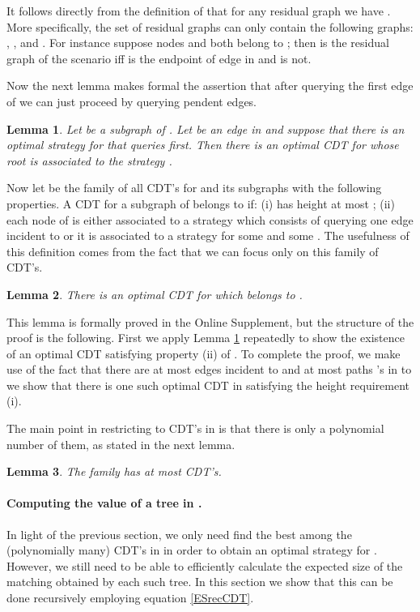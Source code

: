 \documentclass[12pt]{article}
\newtheorem{lemma}{Lemma}
\begin{document}
	It follows directly from the definition of  that for any residual graph  we have . More specifically, the set of residual graphs  can only contain the following graphs: , ,  and . For instance suppose nodes  and  both belong to ; then  is the residual graph of the scenario  iff  is the endpoint of edge in  and  is not. 
	
	Now the next lemma makes formal the assertion that after querying the first edge of  we can just proceed by querying pendent edges.
	
	\begin{lemma} \label{mainLemmaSparse}
		Let  be a subgraph of . Let  be an edge in  and suppose that there is an optimal strategy for  that queries  first. Then there is an optimal CDT for  whose root is associated to the strategy .
	\end{lemma}		

		Now let  be the family of all CDT's for  and its subgraphs with the following properties. A CDT  for a subgraph  of  belongs to  if: (i)  has height at most ; (ii) each node  of  is either associated to a strategy which consists of querying one edge incident to  or it is associated to a strategy  for some  and some . The usefulness of this definition comes from the fact that we can focus only on this family of CDT's.
		
	  \begin{lemma} \label{Fopt}
			There is an optimal CDT for  which belongs to .
		\end{lemma}
		
		This lemma is formally proved in the Online Supplement, but the structure of the proof is the following. First we apply Lemma \ref{mainLemmaSparse} repeatedly to show the existence of an optimal CDT satisfying property (ii) of . To complete the proof, we make use of the fact that there are at most  edges incident to  and at most  paths 's in  to we show that there is one such optimal CDT in  satisfying the height requirement (i). 
		
		The main point in restricting to CDT's in  is that there is only a polynomial number of them, as stated in the next lemma.
		
		\begin{lemma} 
			The family  has at most  CDT's. \label{sizeF}
		\end{lemma}
		
		\paragraph{Computing the value of a tree in .} In light of the previous section, we only need find the best among the (polynomially many) CDT's in  in order to obtain an optimal strategy for . However, we still need to be able to efficiently calculate the expected size of the matching obtained by each such tree. In this section we show that this can be done recursively employing equation \eqref{ESrecCDT}. 
		
\end{document}
